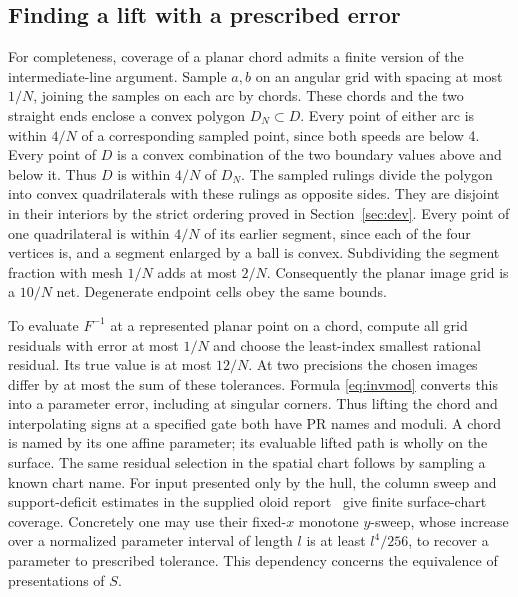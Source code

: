 \documentclass[10pt,letterpaper]{article}
\begin{document}
\subsection*{Finding a lift with a prescribed error}
For completeness, coverage of a planar chord admits a finite version of the intermediate-line argument. Sample $a,b$ on an angular grid with spacing at most $1/N$, joining the samples on each arc by chords. These chords and the two straight ends enclose a convex polygon $D_N\subset D$. Every point of either arc is within $4/N$ of a corresponding sampled point, since both speeds are below 4. Every point of $D$ is a convex combination of the two boundary values above and below it. Thus $D$ is within $4/N$ of $D_N$. The sampled rulings divide the polygon into convex quadrilaterals with these rulings as opposite sides. They are disjoint in their interiors by the strict ordering proved in Section~\ref{sec:dev}. Every point of one quadrilateral is within $4/N$ of its earlier segment, since each of the four vertices is, and a segment enlarged by a ball is convex. Subdividing the segment fraction with mesh $1/N$ adds at most $2/N$. Consequently the planar image grid is a $10/N$ net. Degenerate endpoint cells obey the same bounds.
\par To evaluate $F^{-1}$ at a represented planar point on a chord, compute all grid residuals with error at most $1/N$ and choose the least-index smallest rational residual. Its true value is at most $12/N$. At two precisions the chosen images differ by at most the sum of these tolerances. Formula \eqref{eq:invmod} converts this into a parameter error, including at singular corners. Thus lifting the chord and interpolating signs at a specified gate both have PR names and moduli. A chord is named by its one affine parameter; its evaluable lifted path is wholly on the surface. The same residual selection in the spatial chart follows by sampling a known chart name. For input presented only by the hull, the column sweep and support-deficit estimates in the supplied oloid report~\cite{previous} give finite surface-chart coverage. Concretely one may use their fixed-$x$ monotone $y$-sweep, whose increase over a normalized parameter interval of length $l$ is at least $l^4/256$, to recover a parameter to prescribed tolerance. This dependency concerns the equivalence of presentations of $S$.
\end{document}
